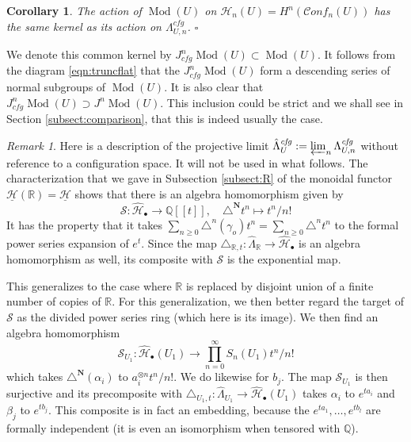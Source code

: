 \documentclass[12pt,letterpaper]{amsart}
\numberwithin{equation}{section}
\def\Nbold{{\mathbf N}}
\def\QQ{{\mathbb Q}}
\def\RR{{\mathbb R}}
\def\g{\gamma}
\def\tri{\triangle}
\def\Hcal{{\mathcal H}}
\def\Scal{{\mathcal S}}
\def\uHcal{{\underline\Hcal}}
\def\pt{{\scriptscriptstyle\bullet}}
\newcommand\conf{\mathscr{C}\!\mathit{onf}\!}
\newcommand\cfg{\mathit{cfg}}
\newcommand\Mod{\operatorname{Mod}}
\newtheorem{corollary}[theorem]{Corollary}
\theoremstyle{remark}
\newtheorem{remark}[theorem]{Remark}
\begin{document}
\begin{corollary}\label{cor:}
The action of $\Mod(U)$ on $\Hcal_n(U)=H^n(\conf_n(U))$ has the same kernel as its action on $\Lambda^\cfg_{U,n}$. \hfill $\square$
\end{corollary}

We denote  this common kernel by  $J_\cfg^n\Mod(U)\subset \Mod(U)$. 
It follows from the diagram \eqref{eqn:truncflat} that  the $J_\cfg^n\Mod(U)$ form  a descending series of normal subgroups of $\Mod(U)$. It is also clear that $J_\cfg^n\Mod(U)\supset J^n\Mod(U)$. This inclusion could be strict and we shall see in Section \ref{subsect:comparison}, that  this is indeed usually the case. 

\begin{remark}
Here is a description of the projective limit  $\hat\Lambda^\cfg_{U}:=\varprojlim_n\Lambda^\cfg_{U,n}$ without reference to a configuration space. It will  not be used in what follows. The  characterization that we gave in  Subsection \ref{subsect:R} of the monoidal functor $\uHcal(\RR)=\uHcal$ shows  that  there is an algebra homomorphism given by 
 \[
\Scal: \widehat \Hcal_\pt\to \QQ[[t]], \quad \tri^{\Nbold}t^n\mapsto t^n/n!
\]
It  has the property that it  takes $\sum_{n\ge 0} \tri^n(\g_o)t^n=\sum_{n\ge 0} \tri^n t^n$  to the formal power series expansion of $e^t$.
Since the map $\tri_{\RR,t}: \hat\Lambda_\RR\to \widehat\Hcal_\pt$ is an algebra homomorphism as well,  its composite with 
$\Scal$ is the exponential map. 

This  generalizes to the case where $\RR$ is replaced by disjoint union of a finite number of copies of 
$\RR$. For this generalization, we then better regard the  target of $\Scal$ as  the divided power series ring (which here is its image). 
We then find an algebra homomorphism
\begin{equation}\label{eqn:divpowers}
\textstyle \Scal_{U_1}: \widehat \Hcal_\pt(U_1)\to \prod_{n=0}^\infty S_n(U_1)t^n/{n!}
\end{equation}
which takes $\tri^{\Nbold}(\alpha_i)$ to $a_i^{\otimes n}t^n/{n!}$. We do likewise for $b_j$. The map  $\Scal_{U_1}$ is then surjective  and   
its  precomposite  with $\tri_{U_1, t}: \hat\Lambda_{U_1}\to \widehat \Hcal_\pt(U_1)$ 
takes   $\alpha_i$ to $e^{ta_i}$ and $\beta_j$ to $e^{tb_j}$. 
This composite is in fact an embedding, 
because the $e^{ta_1} , \dots, e^{tb_l}$ are formally independent  (it is even an isomorphism when tensored with $\QQ$). 


\end{remark}
\end{document}
